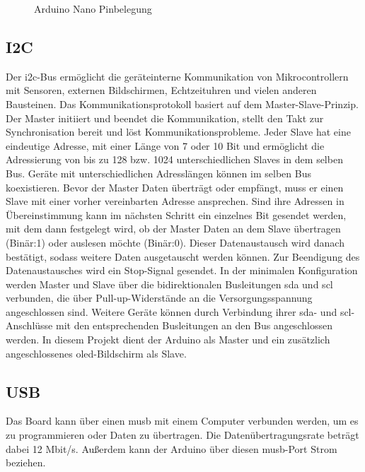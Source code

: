 	\begin{figure}
		
		\caption{Arduino Nano Pinbelegung \cite{Ard.2024}}
		\label{arduinopinout}
	\end{figure}

\subsection{I2C}

Der \ac{i2c}-Bus ermöglicht die geräteinterne Kommunikation von Mikrocontrollern mit Sensoren, externen Bildschirmen, Echtzeituhren und vielen anderen Bausteinen. Das Kommunikationsprotokoll basiert auf dem Master-Slave-Prinzip. Der Master initiiert und beendet die Kommunikation, stellt den Takt zur Synchronisation bereit und löst Kommunikationsprobleme. Jeder Slave hat eine eindeutige Adresse, mit einer Länge von 7 oder 10 Bit und ermöglicht die Adressierung von bis zu 128 bzw. 1024 unterschiedlichen Slaves in dem selben Bus. Geräte mit unterschiedlichen Adresslängen können im selben Bus koexistieren. Bevor der Master Daten überträgt oder empfängt, muss er einen Slave mit einer vorher vereinbarten Adresse ansprechen.\cite{Meroth.2021}\cite{STM1.2015}\cite{Bernstein.2020} Sind ihre Adressen in Übereinstimmung kann im nächsten Schritt ein einzelnes Bit gesendet werden, mit dem dann festgelegt wird, ob der Master Daten an dem Slave übertragen (Binär:1) oder auslesen möchte (Binär:0). Dieser Datenaustausch wird danach bestätigt, sodass weitere Daten ausgetauscht werden können. Zur Beendigung des Datenaustausches wird ein Stop-Signal gesendet.\cite{Gehrke.2022} In der minimalen Konfiguration werden Master und Slave über die bidirektionalen Busleitungen \ac{sda} und \ac{scl} verbunden, die über Pull-up-Widerstände an die Versorgungsspannung angeschlossen sind. Weitere Geräte können durch Verbindung ihrer \ac{sda}- und \ac{scl}-Anschlüsse mit den entsprechenden Busleitungen an den Bus angeschlossen werden.\cite{Meroth.2021} In diesem Projekt dient der Arduino als Master und ein zusätzlich angeschlossenes \ac{oled}-Bildschirm als Slave.

\subsection{USB}

Das Board kann über einen \ac{musb} mit einem Computer verbunden werden, um es zu programmieren oder Daten zu übertragen. Die Datenübertragungsrate beträgt dabei 12 Mbit/s. Außerdem kann der Arduino über diesen \ac{musb}-Port Strom beziehen.

